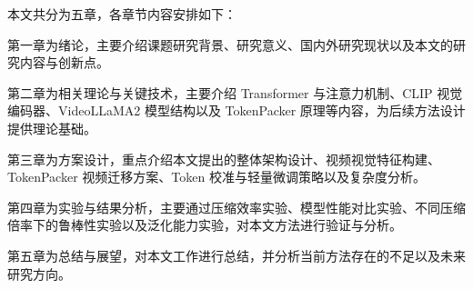 本文共分为五章，各章节内容安排如下：

第一章为绪论，主要介绍课题研究背景、研究意义、国内外研究现状以及本文的研究内容与创新点。

第二章为相关理论与关键技术，主要介绍 Transformer 与注意力机制、CLIP 视觉编码器、VideoLLaMA2 模型结构以及 TokenPacker 原理等内容，为后续方法设计提供理论基础。

第三章为方案设计，重点介绍本文提出的整体架构设计、视频视觉特征构建、TokenPacker 视频迁移方案、Token 校准与轻量微调策略以及复杂度分析。

第四章为实验与结果分析，主要通过压缩效率实验、模型性能对比实验、不同压缩倍率下的鲁棒性实验以及泛化能力实验，对本文方法进行验证与分析。

第五章为总结与展望，对本文工作进行总结，并分析当前方法存在的不足以及未来研究方向。


